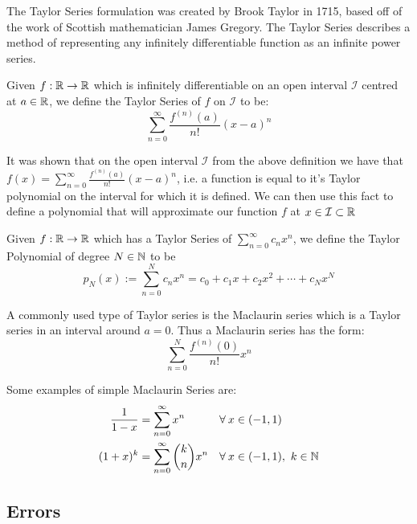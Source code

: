 The Taylor Series formulation was created by Brook Taylor in 1715\cite{BOK_Taylor}, based off of the work of Scottish mathematician James Gregory. The Taylor Series describes a method of representing any infinitely differentiable function as an infinite power series.

\begin{Taylor Series}
\label{DEF_"Taylor Series"}
Given \(f : \mathbb{R} \to \mathbb{R}\) which is infinitely differentiable on an open interval \(\mathcal{I}\) centred at \(a \in \mathbb{R}\), we define the Taylor Series of \(f\) on \(\mathcal{I}\) to be:
\[\sum_{n=0}^{\infty} \frac{f^{(n)}(a)}{n!}(x-a)^n\]
\end{Taylor Series}

It was shown that on the open interval \(\mathcal{I}\) from the above definition we have that \(f(x) = \sum_{n=0}^{\infty} \frac{f^{(n)}(a)}{n!}(x-a)^n\), i.e. a function is equal to it's Taylor polynomial on the interval for which it is defined. We can then use this fact to define a polynomial that will approximate our function \(f\) at \(x \in \mathcal{I} \subset \mathbb{R}\)\\

\begin{Taylor Polynomial}
\label{DEF_"Taylor Polynomial"}
Given \(f : \mathbb{R} \to \mathbb{R}\) which has a Taylor Series of
\( \sum_{n=0}^\infty c_n x^n \), we define the Taylor Polynomial of degree \(N \in \mathbb{N}\) to be
\[ p_N(x) := \sum_{n=0}^N c_n x^n = c_0 + c_1 x + c_2 x^2 + \dotsb + c_N x^N\]
\end{Taylor Polynomial}

A commonly used type of Taylor series is the Maclaurin series which is a Taylor series in an interval around \(a = 0\). Thus a Maclaurin series has the form:
\[\sum_{n=0}^N \frac{f^{(n)}(0)}{n!}x^n\]

Some examples of simple Maclaurin Series are:
\begin{align}
\frac{1}{1-x} &= \sum_{n=0}^\infty x^n &&\forall\: x \in (-1,1)\\
(1 + x)^k	  &= \sum_{n=0}^\infty \binom{k}{n} x^n 
					&&\forall\: x \in (-1,1),\  k \in \mathbb{N}
					\label{EQN_"Maclaurin Series 1"}
\end{align}

\subsection{Errors}
\label{SUB_"Error Definitions"}
\theoremstyle{definition}
\newtheorem{Absolute Error}{Definition}[subsection]
\newtheorem{Iteration Error}[Absolute Error]{Definition}

